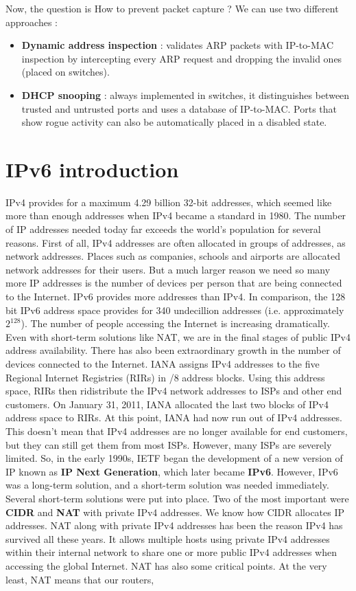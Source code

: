 \documentclass[11pt]{article}
\begin{document}
Now, the question is How to prevent packet capture ? We can use two different approaches :
\begin{itemize}
\item \textbf{Dynamic address inspection} : validates ARP packets with IP-to-MAC inspection by intercepting every ARP request and dropping the invalid ones (placed on switches).
\item \textbf{DHCP snooping} : always implemented in switches, it distinguishes between trusted and untrusted ports and uses a database of IP-to-MAC. Ports that show rogue activity can also be automatically placed in a disabled state.
\end{itemize}
\section{IPv6 introduction}
IPv4 provides for a maximum 4.29 billion 32-bit addresses, which seemed like more than enough addresses when IPv4 became a standard in 1980. The number of IP addresses needed today far exceeds the world's population for several reasons. First of all, IPv4 addresses are often allocated in groups of addresses, as network addresses. Places such as companies, schools and airports are allocated network addresses
for their users. But a much larger reason we need so many more IP addresses is the number of devices per person that are being connected to the Internet. IPv6 provides more addresses than IPv4. In comparison, the 128 bit IPv6 address space provides for 340 undecillion addresses (i.e. approximately $2^128$). The number of people accessing the Internet is increasing dramatically. Even with short-term solutions like NAT, we are in the final stages of public IPv4 address availability. There has also been extraordinary growth in the number of devices connected to the Internet. IANA assigns IPv4 addresses to the five Regional Internet Registries (RIRs) in /8 address blocks. Using this address space, RIRs then ridistribute the IPv4 network addresses to ISPs and other end customers. On January 31, 2011, IANA allocated the last two blocks of IPv4 address space to RIRs. At this point, IANA had now run out of IPv4 addresses. This doesn't mean that IPv4 addresses are no longer available for end customers, but
they can still get them from most ISPs. However, many ISPs are severely limited. So, in the early 1990s, IETF began the development of a new version of IP known as \textbf{IP Next Generation}, which later became \textbf{IPv6}. However, IPv6 was a long-term solution, and a short-term solution was needed immediately. Several short-term solutions were put into place. Two of the most important were \textbf{CIDR} and \textbf{NAT} with private IPv4 addresses. We know how CIDR allocates IP addresses. NAT along with private IPv4 addresses has been the reason IPv4 has survived all these years. It allows multiple hosts using private IPv4  addresses within their internal network to share one or more public IPv4 addresses when accessing the global Internet. NAT has also some critical points. At the very least, NAT means that our routers,
\end{document}
